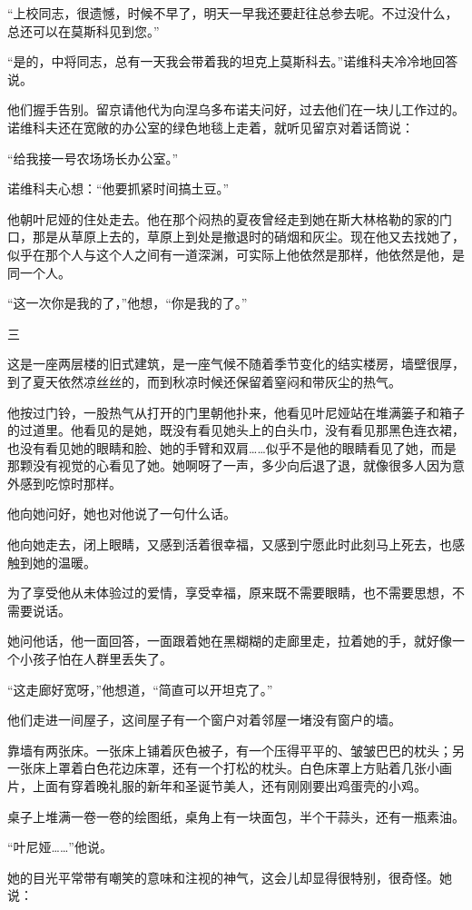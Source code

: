 “上校同志，很遗憾，时候不早了，明天一早我还要赶往总参去呢。不过没什么，总还可以在莫斯科见到您。”

“是的，中将同志，总有一天我会带着我的坦克上莫斯科去。”诺维科夫冷冷地回答说。

他们握手告别。留京请他代为向涅乌多布诺夫问好，过去他们在一块儿工作过的。诺维科夫还在宽敞的办公室的绿色地毯上走着，就听见留京对着话筒说：

“给我接一号农场场长办公室。”

诺维科夫心想：“他要抓紧时间搞土豆。”

他朝叶尼娅的住处走去。他在那个闷热的夏夜曾经走到她在斯大林格勒的家的门口，那是从草原上去的，草原上到处是撤退时的硝烟和灰尘。现在他又去找她了，似乎在那个人与这个人之间有一道深渊，可实际上他依然是那样，他依然是他，是同一个人。

“这一次你是我的了，”他想，“你是我的了。”

三

这是一座两层楼的旧式建筑，是一座气候不随着季节变化的结实楼房，墙壁很厚，到了夏天依然凉丝丝的，而到秋凉时候还保留着窒闷和带灰尘的热气。

他按过门铃，一股热气从打开的门里朝他扑来，他看见叶尼娅站在堆满篓子和箱子的过道里。他看见的是她，既没有看见她头上的白头巾，没有看见那黑色连衣裙，也没有看见她的眼睛和脸、她的手臂和双肩……似乎不是他的眼睛看见了她，而是那颗没有视觉的心看见了她。她啊呀了一声，多少向后退了退，就像很多人因为意外感到吃惊时那样。

他向她问好，她也对他说了一句什么话。

他向她走去，闭上眼睛，又感到活着很幸福，又感到宁愿此时此刻马上死去，也感触到她的温暖。

为了享受他从未体验过的爱情，享受幸福，原来既不需要眼睛，也不需要思想，不需要说话。

她问他话，他一面回答，一面跟着她在黑糊糊的走廊里走，拉着她的手，就好像一个小孩子怕在人群里丢失了。

“这走廊好宽呀，”他想道，“简直可以开坦克了。”

他们走进一间屋子，这间屋子有一个窗户对着邻屋一堵没有窗户的墙。

靠墙有两张床。一张床上铺着灰色被子，有一个压得平平的、皱皱巴巴的枕头；另一张床上罩着白色花边床罩，还有一个打松的枕头。白色床罩上方贴着几张小画片，上面有穿着晚礼服的新年和圣诞节美人，还有刚刚要出鸡蛋壳的小鸡。

桌子上堆满一卷一卷的绘图纸，桌角上有一块面包，半个干蒜头，还有一瓶素油。

“叶尼娅……”他说。

她的目光平常带有嘲笑的意味和注视的神气，这会儿却显得很特别，很奇怪。她说：

